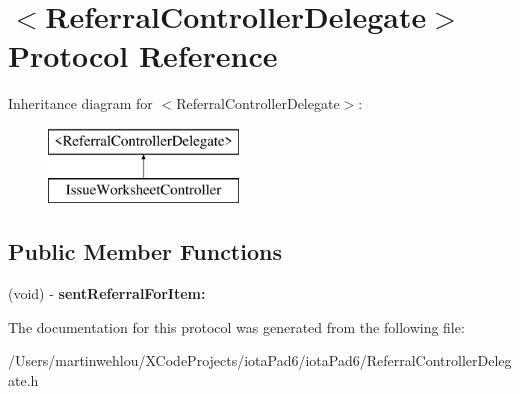 \hypertarget{protocol_referral_controller_delegate-p}{
\section{$<$ReferralControllerDelegate$>$ Protocol Reference}
\label{protocol_referral_controller_delegate-p}
}
Inheritance diagram for $<$ReferralControllerDelegate$>$:\begin{figure}[H]
\begin{center}
\leavevmode
\includegraphics[height=2.000000cm]{protocol_referral_controller_delegate-p}
\end{center}
\end{figure}
\subsection*{Public Member Functions}
\begin{DoxyCompactItemize}
\item 
\hypertarget{protocol_referral_controller_delegate-p_a7c62419a2031360313a8d5b4b6e7c5e1}{
(void) -\/ {\bfseries sentReferralForItem:}}
\label{protocol_referral_controller_delegate-p_a7c62419a2031360313a8d5b4b6e7c5e1}

\end{DoxyCompactItemize}


The documentation for this protocol was generated from the following file:\begin{DoxyCompactItemize}
\item 
/Users/martinwehlou/XCodeProjects/iotaPad6/iotaPad6/ReferralControllerDelegate.h\end{DoxyCompactItemize}
